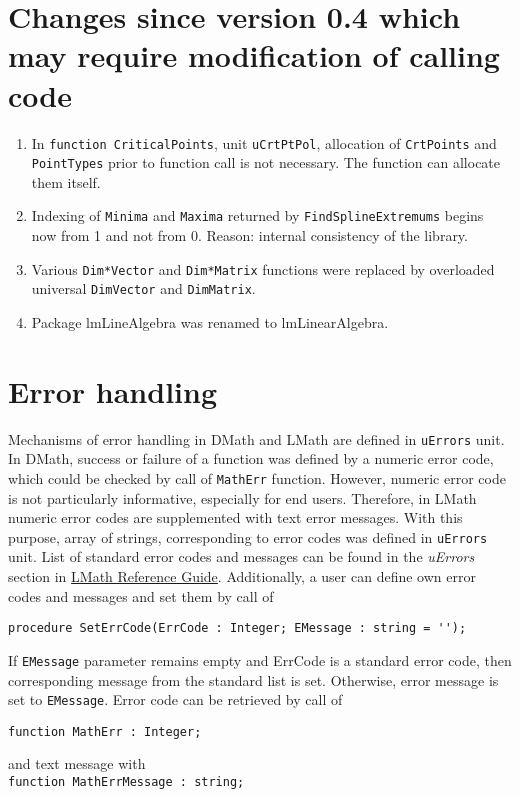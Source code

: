 \documentclass[12pt,a4paper,oneside]{article}
\newcommand{\code}[1]{\texttt{#1}}
\begin{document}
\section{Changes since version 0.4 which may require modification of calling code}
\begin{enumerate}
	\item In \code{function CriticalPoints}, unit \code{uCrtPtPol}, allocation of \code{CrtPoints} and \code{PointTypes} prior to function call is not necessary. The function can allocate them itself.
	\item Indexing of \code{Minima} and \code{Maxima} returned by \code{FindSplineExtremums} begins now from 1 and not from 0. Reason: internal consistency of the library.
	\item Various \code{Dim*Vector} and \code{Dim*Matrix} functions were replaced by overloaded universal \code{DimVector} and \code{DimMatrix}.
	\item Package lmLineAlgebra was renamed to lmLinearAlgebra.  
\end{enumerate}
\section{Error handling}
Mechanisms of error handling in DMath and LMath are defined in \code{uErrors} unit. In DMath, success or failure of a function was defined by a numeric error code, which could be checked by call of \code{MathErr} function.
However, numeric error code is not particularly informative, especially for end users. Therefore, in LMath numeric error codes are supplemented with text error messages. With this purpose, array of strings, corresponding to error codes was defined in \code{uErrors} unit. List of standard error codes and messages can be found in the \textit{uErrors} section in \hyperref{file:LMath05.pdf}{}{}{LMath Reference Guide}. Additionally, a user can define own error codes and messages and set them by call of
\begin{verbatim}
procedure SetErrCode(ErrCode : Integer; EMessage : string = '');
\end{verbatim}
If \code{EMessage} parameter remains empty and ErrCode is a standard error code, then corresponding message from the standard list is set. Otherwise, error message is set to \code{EMessage}. Error code can be retrieved by call of
\begin{verbatim}
function MathErr : Integer;
\end{verbatim}
and text message with\\
\code{function MathErrMessage : string;}
\end{document}
